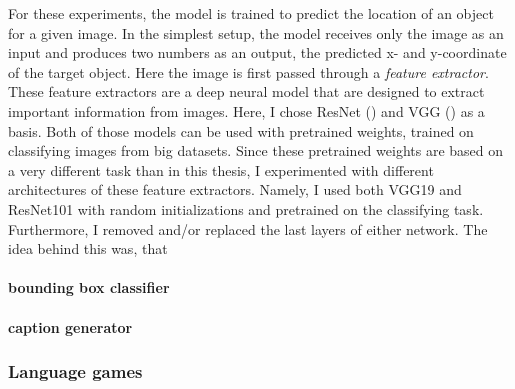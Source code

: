 For these experiments, the model is trained to predict the location of an object for a given image. In the simplest setup, the model receives only the image as an input and produces two numbers as an output, the predicted x- and y-coordinate of the target object. Here the image is first passed through a \emph{feature extractor}. These feature extractors are a deep neural model that are designed to extract important information from images. Here, I chose ResNet (\cite{He2016}) and VGG (\cite{Simonyan2015}) as a basis. Both of those models can be used with pretrained weights, trained on classifying images from big datasets. Since these pretrained weights are based on a very different task than in this thesis, I experimented with different architectures of these feature extractors. Namely, I used both VGG19 and ResNet101 with random initializations and pretrained on the classifying task. Furthermore, I removed and/or replaced the last layers of either network. The idea behind this was, that 

\paragraph{bounding box classifier}

\paragraph{caption generator}

\subsubsection{Language games}